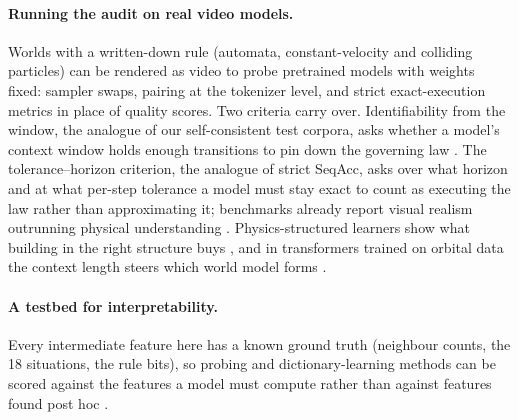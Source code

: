 \documentclass[11pt]{article}
\begin{document}
\paragraph{Running the audit on real video models.}
Worlds with a written-down rule (automata, constant-velocity and colliding particles) can be rendered as video to probe pretrained models with weights fixed: sampler swaps, pairing at the tokenizer level, and strict exact-execution metrics in place of quality scores. Two criteria carry over. Identifiability from the window, the analogue of our self-consistent test corpora, asks whether a model's context window holds enough transitions to pin down the governing law \citep{ha2018world, openai2024sora, bruce2024genie, valevski2024diffusion}. The tolerance--horizon criterion, the analogue of strict SeqAcc, asks over what horizon and at what per-step tolerance a model must stay exact to count as executing the law rather than approximating it; benchmarks already report visual realism outrunning physical understanding \citep{motamed2025physicsiq, bansal2024videophy, bear2021physion}. Physics-structured learners show what building in the right structure buys \citep{sanchezgonzalez2020learning, greydanus2019hamiltonian, cranmer2020lagrangian, chen2018neural, gillman2025force}, and in transformers trained on orbital data the context length steers which world model forms \citep{liu2026newton}.

\paragraph{A testbed for interpretability.}
Every intermediate feature here has a known ground truth (neighbour counts, the 18 situations, the rule bits), so probing and dictionary-learning methods can be scored against the features a model must compute rather than against features found post hoc \citep{elhage2022toy, bricken2023towards}.
\end{document}
